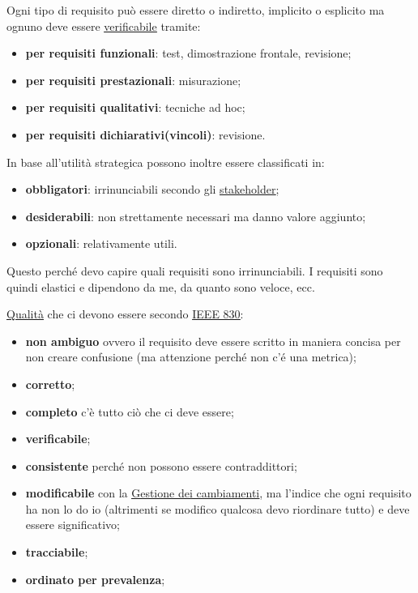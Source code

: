 		Ogni tipo di requisito può essere diretto o indiretto, implicito o esplicito ma ognuno deve essere \underline{\hyperref[verificare]{verificabile}} tramite:
		\begin{itemize}
			\item \textbf{per requisiti funzionali}: test, dimostrazione frontale, revisione;
			\item \textbf{per requisiti prestazionali}: misurazione;
			\item \textbf{per requisiti qualitativi}: tecniche ad hoc;
			\item \textbf{per requisiti dichiarativi(vincoli)}: revisione.
		\end{itemize}
	
		In base all'utilità strategica possono inoltre essere classificati in:
		\begin{itemize}
			\item \textbf{obbligatori}: irrinunciabili secondo gli \underline{\hyperref[stakeholder]{stakeholder}};
			\item \textbf{desiderabili}: non strettamente necessari ma danno valore aggiunto; 
			\item \textbf{opzionali}: relativamente utili.
		\end{itemize}
		Questo perché devo capire quali requisiti sono irrinunciabili. I requisiti sono quindi elastici e dipendono da me, da quanto sono veloce, ecc.
			
		\underline{\hyperref[qualita]{Qualità}} che ci devono essere secondo \underline{\hyperref[ieee830]{IEEE 830}}:
		\begin{itemize} %
			\item \textbf{non ambiguo} ovvero il requisito deve essere scritto in maniera concisa per non creare confusione (ma attenzione perché non c'é una metrica);
			\item \textbf{corretto};
			\item \textbf{completo} c'è tutto ciò che ci deve essere;
			\item \textbf{verificabile};
			\item \textbf{consistente} perché non possono essere contraddittori;
			\item \textbf{modificabile} con la \underline{\hyperref[gestionecambiamenti]{Gestione dei cambiamenti}}, ma l'indice che ogni requisito ha non lo do io (altrimenti se modifico qualcosa devo riordinare tutto) e deve essere significativo;
			\item \textbf{tracciabile};
			\item \textbf{ordinato per prevalenza};		
		\end{itemize}	
	
